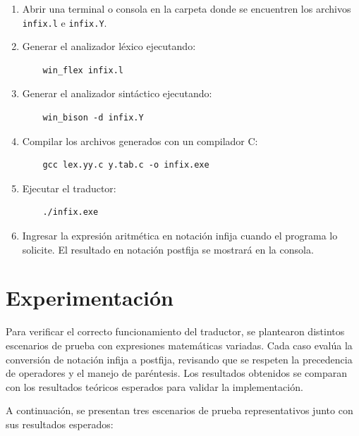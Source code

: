 \documentclass{article}
\begin{document}
\begin{enumerate}
    \item Abrir una terminal o consola en la carpeta donde se encuentren los archivos \texttt{infix.l} e \texttt{infix.Y}.
    \item Generar el analizador léxico ejecutando:
    \begin{verbatim}
    win_flex infix.l
    \end{verbatim}

    \item Generar el analizador sintáctico ejecutando:
    \begin{verbatim}
    win_bison -d infix.Y
    \end{verbatim}

    \item Compilar los archivos generados con un compilador C:
    \begin{verbatim}
    gcc lex.yy.c y.tab.c -o infix.exe
    \end{verbatim}

    \item Ejecutar el traductor:
    \begin{verbatim}
    ./infix.exe
    \end{verbatim}

    \item Ingresar la expresión aritmética en notación infija cuando el programa lo solicite. El resultado en notación postfija se mostrará en la consola.
\end{enumerate}


\section{Experimentación}\label{sec:exp}
Para verificar el correcto funcionamiento del traductor, se plantearon distintos escenarios de prueba con expresiones matemáticas variadas. Cada caso evalúa la conversión de notación infija a postfija, revisando que se respeten la precedencia de operadores y el manejo de paréntesis. Los resultados obtenidos se comparan con los resultados teóricos esperados para validar la implementación.

A continuación, se presentan tres escenarios de prueba representativos junto con sus resultados esperados:
\end{document}
